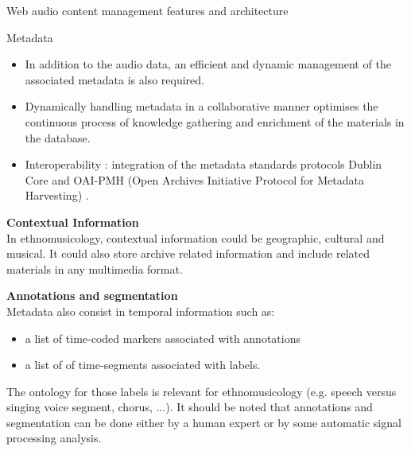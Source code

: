 \documentclass[final, hyperref, table]{beamer}
\begin{document}
\begin{frame}[containsverbatim]{}
\begin{columns}[T]
\begin{column}[T]{.49\linewidth}
\begin{block}{Web audio content management features and architecture}
      \end{block}
      \begin{block}{Metadata}
        \vspace{-0.5cm}
        \begin{itemize}
        \item In addition to the audio data, an efficient and \alert{dynamic
            management} of the associated metadata is also required.
        \item Dynamically handling metadata in a \alert{collaborative} manner optimises
          the continuous process of knowledge gathering and enrichment of
          the materials in the database.
        \item Interoperability : integration of the metadata standards protocols \alert{Dublin Core}
          and \alert{OAI-PMH} (Open Archives Initiative Protocol for Metadata
          Harvesting) \cite{DublinCore,OAI-PMH}.
        \end{itemize}
        
        \textbf{Contextual Information}\\
        In ethnomusicology, contextual information could be geographic, cultural and musical. It could also store archive related information and include related materials in any multimedia format. 
        
        \textbf{Annotations and segmentation}\\
        Metadata also consist in temporal information such as:
        \begin{itemize}
        \item a list of \alert{time-coded markers} associated with annotations
        \item a list of of \alert{time-segments} associated with labels.
        \end{itemize}
        The ontology for those labels is relevant for ethnomusicology (e.g. speech versus singing voice segment, chorus, ...).
        It should be noted that annotations and segmentation can be done either by a human expert or by some automatic signal processing analysis.
      \end{block}
      

\end{column}
\end{columns}
\end{frame}
\end{document}
